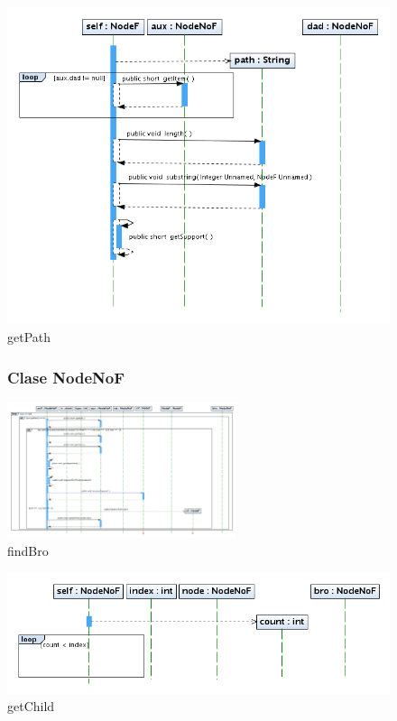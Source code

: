 \begin{figure}
\centering
\includegraphics[width=1\textwidth]{imgsSecuencia/NodeF/getPath.png}
\caption{getPath}
\end{figure}
\newpage


\begin{figure}
\subsubsection{Clase NodeNoF}
\centering
\includegraphics[angle=90, width=0.6\textwidth]{imgsSecuencia/NodeNoF/findBro.png}
\caption{findBro}
\end{figure}
\newpage

\begin{figure}
\centering
\includegraphics[width=1\textwidth]{imgsSecuencia/NodeNoF/getChild.png}
\caption{getChild}
\end{figure}
\newpage

